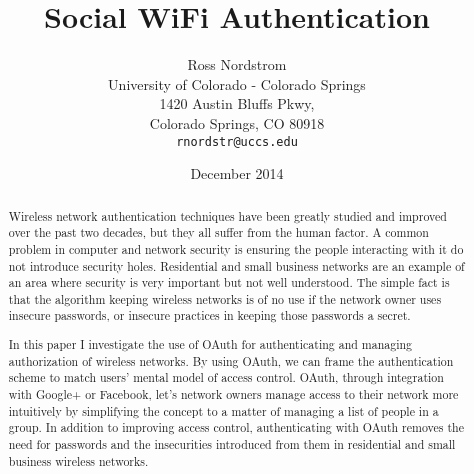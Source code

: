 \documentclass{sig-alternate}
\begin{document}
\title{Social WiFi Authentication}
\author{Ross Nordstrom\\
        University of Colorado - Colorado Springs\\
        1420 Austin Bluffs Pkwy,\\
        Colorado Springs, CO 80918\\
        \texttt{rnordstr@uccs.edu}
       }
\date{December 2014}

\maketitle

\begin{abstract}
Wireless network authentication techniques have been greatly studied and improved over the past two
decades, but they all suffer from the human factor. A common problem in computer and network
security is ensuring the people interacting with it do not introduce security holes. Residential
and small business networks are an example of an area where security is very important but not well
understood. The simple fact is that the algorithm keeping wireless networks is of no use if the
network owner uses insecure passwords, or insecure practices in keeping those passwords a secret.

In this paper I investigate the use of OAuth for authenticating and managing authorization of
wireless networks. By using OAuth, we can frame the authentication scheme to match users' mental
model of access control. OAuth, through integration with Google+ or Facebook, let's network owners
manage access to their network more intuitively by simplifying the concept to a matter of managing
a list of people in a group. In addition to improving access control, authenticating with OAuth
removes the need for passwords and the insecurities introduced from them in residential and small
business wireless networks.
\end{abstract}










{}



\end{document}
